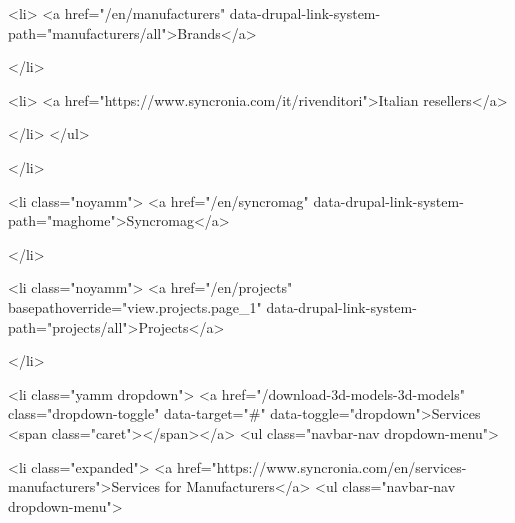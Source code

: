                    
            
      
            
    

                    <li>
                  <a href="/en/manufacturers" data-drupal-link-system-path="manufacturers/all">Brands</a>
                    
            </li>
        
                   
            
      
            
    

                    <li>
                  <a href="https://www.syncronia.com/it/rivenditori">Italian resellers</a>
                    
            </li>
        </ul>
  
      
            </li>
        
                   
            
      
            
    

                    <li class="noyamm">
                  <a href="/en/syncromag" data-drupal-link-system-path="maghome">Syncromag</a>
                    
            </li>
        
                   
            
      
            
    

                    <li class="noyamm">
                  <a href="/en/projects" basepathoverride="view.projects.page_1" data-drupal-link-system-path="projects/all">Projects</a>
                    
            </li>
        
                   
            
      
            
    

                   
        <li class="yamm dropdown">
        <a href="/download-3d-models-3d-models" class="dropdown-toggle" data-target="#" data-toggle="dropdown">Services <span class="caret"></span></a>
                                  <ul class="navbar-nav dropdown-menu">
            
                   
            
      
            
    

                    <li class="expanded">
                  <a href="https://www.syncronia.com/en/services-manufacturers">Services for Manufacturers</a>
                                          <ul class="navbar-nav dropdown-menu">
            
